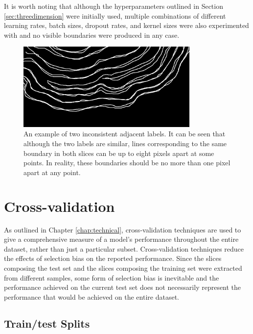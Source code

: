 It is worth noting that although the hyperparameters outlined in Section \ref{sec:threedimension} were initially used, multiple combinations of different learning rates, batch sizes, dropout rates, and kernel sizes were also experimented with and no visible boundaries were produced in any case.

\begin{figure}[t]
    \centering
    \includegraphics[width=0.8\textwidth]{images/3D-label-example.png}
    \caption{An example of two inconsistent adjacent labels. It can be seen that although the two labels are similar, lines corresponding to the same boundary in both slices can be up to eight pixels apart at some points. In reality, these boundaries should be no more than one pixel apart at any point.}
    \label{fig:3dlabel}
\end{figure}

\section{Cross-validation}
\label{sec:evalcrossval}

As outlined in Chapter \ref{chap:technical}, cross-validation techniques are used to give a comprehensive measure of a model's performance throughout the entire dataset, rather than just a particular subset. Cross-validation techniques reduce the effects of selection bias on the reported performance. Since the slices composing the test set and the slices composing the training set were extracted from different samples, some form of selection bias is inevitable and the performance achieved on the current test set does not necessarily represent the performance that would be achieved on the entire dataset.

\subsection{Train/test Splits}


